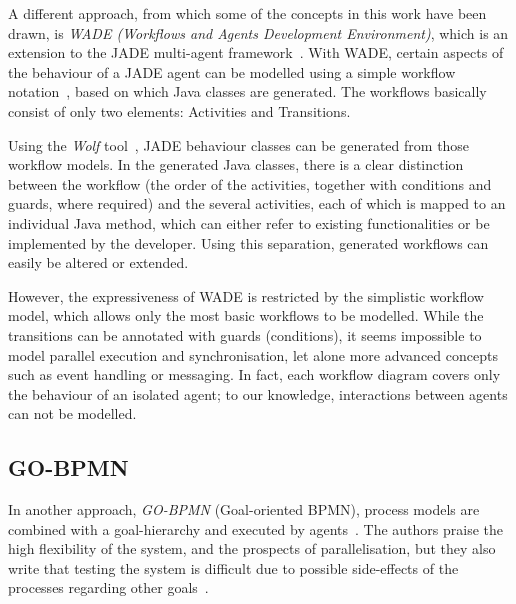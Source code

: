 A different approach, from which some of the concepts in this work have been
drawn, is \emph{WADE (Workflows and Agents Development Environment)}, which is
an extension to the JADE multi-agent framework~\cite{bellifemine1999jade}.
With WADE, certain aspects of the behaviour of a JADE agent can be modelled
using a simple workflow notation~\cite{caire2008wade,caire2010wade}, based on
which Java classes are generated.  The workflows basically consist of only two
elements: Activities and Transitions.

Using the \emph{Wolf} tool~\cite{caire2008wolf}, JADE behaviour classes can be
generated from those workflow models.  In the generated Java classes, there is
a clear distinction between the workflow (the order of the activities, together
with conditions and guards, where required) and the several activities, each of
which is mapped to an individual Java method, which can either refer to existing
functionalities or be implemented by the developer.  Using this separation,
generated workflows can easily be altered or extended.

However, the expressiveness of WADE is restricted by the simplistic workflow
model, which allows only the most basic workflows to be modelled.  While the
transitions can be annotated with guards (conditions), it seems impossible to
model parallel execution and synchronisation, let alone more advanced concepts
such as event handling or messaging.  In fact, each workflow diagram covers only
the behaviour of an isolated agent; to our knowledge, interactions between agents
can not be modelled.



\subsection{GO-BPMN}

In another approach, \emph{GO-BPMN} (Goal-oriented BPMN), process models are
combined with a goal-hierarchy and executed by agents~\cite{calisti2008goaloriented}.
The authors praise the high flexibility of the system, and the prospects of
parallelisation, but they also write that testing the system is difficult due to
possible side-effects of the processes regarding other goals~\cite{burmeister2008bdiagents}.

